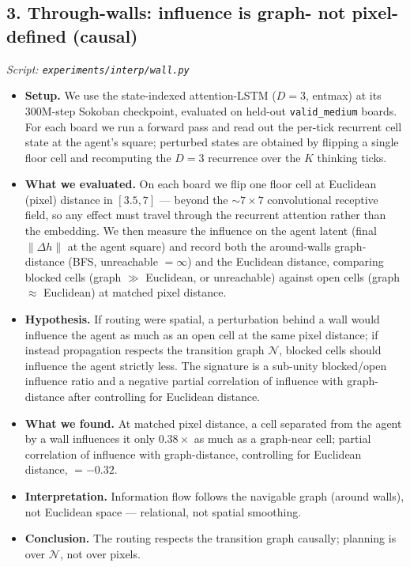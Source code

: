 \documentclass[11pt]{article}
\begin{document}
\subsection*{3. Through-walls: influence is graph- not pixel-defined (causal)}
\textit{Script: \texttt{experiments/interp/wall.py}}
\begin{itemize}
\item \textbf{Setup.} We use the state-indexed attention-LSTM ($D=3$, entmax) at its 300M-step Sokoban checkpoint, evaluated on held-out \texttt{valid\_medium} boards. For each board we run a forward pass and read out the per-tick recurrent cell state at the agent's square; perturbed states are obtained by flipping a single floor cell and recomputing the $D=3$ recurrence over the $K$ thinking ticks.
\item \textbf{What we evaluated.} On each board we flip one floor cell at Euclidean (pixel) distance in $[3.5, 7]$ --- beyond the $\sim 7\times7$ convolutional receptive field, so any effect must travel through the recurrent attention rather than the embedding. We then measure the influence on the agent latent (final $\lVert \Delta h \rVert$ at the agent square) and record both the around-walls graph-distance (BFS, unreachable $=\infty$) and the Euclidean distance, comparing blocked cells (graph $\gg$ Euclidean, or unreachable) against open cells (graph $\approx$ Euclidean) at matched pixel distance.
\item \textbf{Hypothesis.} If routing were spatial, a perturbation behind a wall would influence the agent as much as an open cell at the same pixel distance; if instead propagation respects the transition graph $\mathcal{N}$, blocked cells should influence the agent strictly less. The signature is a sub-unity blocked/open influence ratio and a negative partial correlation of influence with graph-distance after controlling for Euclidean distance.
\item \textbf{What we found.} At matched pixel distance, a cell separated from the agent by a wall influences it only $0.38\times$ as much as a graph-near cell; partial correlation of influence with graph-distance, controlling for Euclidean distance, $=-0.32$.
\item \textbf{Interpretation.} Information flow follows the navigable graph (around walls), not Euclidean space --- relational, not spatial smoothing.
\item \textbf{Conclusion.} The routing respects the transition graph causally; planning is over $\mathcal{N}$, not over pixels.
\end{itemize}
\clearpage
\end{document}
